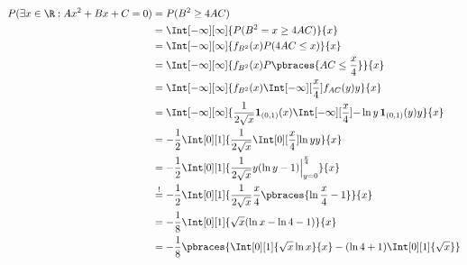 \begin{solution}
\begin{enumerate}[label = (\alph*)]
\begin{enumerate}[label = \arabic*.]
        \begin{align*}
            P(\exists x \in \R: A x^2 + B x + C = 0)
            & =
            P(B^2 \geq 4 A C) \\
            & =
            \Int[-\infty][\infty]
            {
                P(B^2 = x \geq 4 A C)
            }{x} \\
            & =
            \Int[-\infty][\infty]
            {
                f_{B^2}(x)
                P(4 A C \leq x)
            }{x} \\
            & =
            \Int[-\infty][\infty]
            {
                f_{B^2}(x)
                P \pbraces{A C \leq \frac{x}{4}}
            }{x} \\
            & =
            \Int[-\infty][\infty]
            {
                f_{B^2}(x)
                \Int[-\infty][\frac{x}{4}]
                {
                    f_{A C}(y)
                }{y}
            }{x} \\
            & =
            \Int[-\infty][\infty]
            {
                \frac{1}{2 \sqrt x} \mathbf 1_{(0, 1)}(x)
                \Int[-\infty][\frac{x}{4}]
                {
                    -\ln y \, \mathbf 1_{(0, 1)}(y)
                }{y}
            }{x} \\
            & =
            -\frac{1}{2}
            \Int[0][1]
            {
                \frac{1}{2 \sqrt x}
                \Int[0][\frac{x}{4}]
                {
                    \ln y
                }{y}
            }{x} \\
            & =
            -\frac{1}{2}
            \Int[0][1]
            {
                \frac{1}{2 \sqrt x}
                y (\ln y - 1) \Big |_{y=0}^\frac{x}{4}
            }{x} \\
            & \stackrel{!}{=}
            -\frac{1}{2}
            \Int[0][1]
            {
                \frac{1}{2 \sqrt x}
                \frac{x}{4} \pbraces{\ln \frac{x}{4} - 1}
            }{x} \\
            & =
            -\frac{1}{8}
            \Int[0][1]
            {
                \sqrt x
                (
                    \ln x - \ln 4 - 1
                )
            }{x} \\
            & =
            -\frac{1}{8}
            \pbraces
            {
                \Int[0][1]
                {
                    \sqrt x \ln x
                }{x}
                -
                (\ln 4 + 1)
                \Int[0][1]
                {
                    \sqrt x
}}
\end{align*}
\end{enumerate}
\end{enumerate}
\end{solution}
